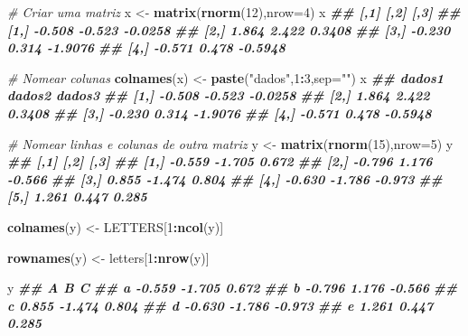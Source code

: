 \documentclass[
]{book}
\newenvironment{Shaded}{\begin{snugshade}}{\end{snugshade}}
\newcommand{\AttributeTok}[1]{\textcolor[rgb]{0.13,0.29,0.53}{#1}}
\newcommand{\CommentTok}[1]{\textcolor[rgb]{0.56,0.35,0.01}{\textit{#1}}}
\newcommand{\DecValTok}[1]{\textcolor[rgb]{0.00,0.00,0.81}{#1}}
\newcommand{\DocumentationTok}[1]{\textcolor[rgb]{0.56,0.35,0.01}{\textbf{\textit{#1}}}}
\newcommand{\FunctionTok}[1]{\textcolor[rgb]{0.13,0.29,0.53}{\textbf{#1}}}
\newcommand{\NormalTok}[1]{#1}
\newcommand{\OtherTok}[1]{\textcolor[rgb]{0.56,0.35,0.01}{#1}}
\newcommand{\SpecialCharTok}[1]{\textcolor[rgb]{0.81,0.36,0.00}{\textbf{#1}}}
\newcommand{\StringTok}[1]{\textcolor[rgb]{0.31,0.60,0.02}{#1}}
\begin{document}
\begin{Shaded}
\begin{Highlighting}[]
\CommentTok{\# Criar uma matriz}
\NormalTok{x }\OtherTok{\textless{}{-}} \FunctionTok{matrix}\NormalTok{(}\FunctionTok{rnorm}\NormalTok{(}\DecValTok{12}\NormalTok{),}\AttributeTok{nrow=}\DecValTok{4}\NormalTok{)}
\NormalTok{x}
\DocumentationTok{\#\#        [,1]   [,2]    [,3]}
\DocumentationTok{\#\# [1,] {-}0.508 {-}0.523 {-}0.0258}
\DocumentationTok{\#\# [2,]  1.864  2.422  0.3408}
\DocumentationTok{\#\# [3,] {-}0.230  0.314 {-}1.9076}
\DocumentationTok{\#\# [4,] {-}0.571  0.478 {-}0.5948}

\CommentTok{\# Nomear colunas}
\FunctionTok{colnames}\NormalTok{(x) }\OtherTok{\textless{}{-}} \FunctionTok{paste}\NormalTok{(}\StringTok{"dados"}\NormalTok{,}\DecValTok{1}\SpecialCharTok{:}\DecValTok{3}\NormalTok{,}\AttributeTok{sep=}\StringTok{""}\NormalTok{)}
\NormalTok{x}
\DocumentationTok{\#\#      dados1 dados2  dados3}
\DocumentationTok{\#\# [1,] {-}0.508 {-}0.523 {-}0.0258}
\DocumentationTok{\#\# [2,]  1.864  2.422  0.3408}
\DocumentationTok{\#\# [3,] {-}0.230  0.314 {-}1.9076}
\DocumentationTok{\#\# [4,] {-}0.571  0.478 {-}0.5948}

\CommentTok{\# Nomear linhas e colunas de outra matriz}
\NormalTok{y }\OtherTok{\textless{}{-}} \FunctionTok{matrix}\NormalTok{(}\FunctionTok{rnorm}\NormalTok{(}\DecValTok{15}\NormalTok{),}\AttributeTok{nrow=}\DecValTok{5}\NormalTok{)}
\NormalTok{y }
\DocumentationTok{\#\#        [,1]   [,2]   [,3]}
\DocumentationTok{\#\# [1,] {-}0.559 {-}1.705  0.672}
\DocumentationTok{\#\# [2,] {-}0.796  1.176 {-}0.566}
\DocumentationTok{\#\# [3,]  0.855 {-}1.474  0.804}
\DocumentationTok{\#\# [4,] {-}0.630 {-}1.786 {-}0.973}
\DocumentationTok{\#\# [5,]  1.261  0.447  0.285}

\FunctionTok{colnames}\NormalTok{(y) }\OtherTok{\textless{}{-}}\NormalTok{ LETTERS[}\DecValTok{1}\SpecialCharTok{:}\FunctionTok{ncol}\NormalTok{(y)]}

\FunctionTok{rownames}\NormalTok{(y) }\OtherTok{\textless{}{-}}\NormalTok{ letters[}\DecValTok{1}\SpecialCharTok{:}\FunctionTok{nrow}\NormalTok{(y)]}

\NormalTok{y}
\DocumentationTok{\#\#        A      B      C}
\DocumentationTok{\#\# a {-}0.559 {-}1.705  0.672}
\DocumentationTok{\#\# b {-}0.796  1.176 {-}0.566}
\DocumentationTok{\#\# c  0.855 {-}1.474  0.804}
\DocumentationTok{\#\# d {-}0.630 {-}1.786 {-}0.973}
\DocumentationTok{\#\# e  1.261  0.447  0.285}
\end{Highlighting}
\end{Shaded}
\end{document}
